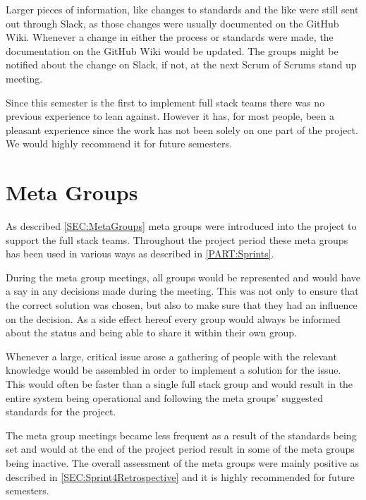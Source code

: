 Larger pieces of information, like changes to standards and the like were still sent out through Slack, as those changes were usually documented on the GitHub Wiki.
Whenever a change in either the process or standards were made, the documentation on the GitHub Wiki would be updated. 
The groups might be notified about the change on Slack, if not, at the next Scrum of Scrums stand up meeting.

Since this semester is the first to implement full stack teams there was no previous experience to lean against. 
However it has, for most people, been a pleasant experience since the work has not been solely on one part of the project.
We would highly recommend it for future semesters.

\section{Meta Groups}
As described \autoref{SEC:MetaGroups} meta groups were introduced into the project to support the full stack teams.
Throughout the project period these meta groups has been used in various ways as described in \autoref{PART:Sprints}. 

During the meta group meetings, all groups would be represented and would have a say in any decisions made during the meeting.
This was not only to ensure that the correct solution was chosen, but also to make sure that they had an influence on the decision.
As a side effect hereof every group would always be informed about the status and being able to share it within their own group.

Whenever a large, critical issue arose a gathering of people with the relevant knowledge would be assembled in order to implement a solution for the issue. 
This would often be faster than a single full stack group and would result in the entire system being operational and following the meta groups' suggested standards for the project.
  
The meta group meetings became less frequent as a result of the standards being set and would at the end of the project period result in some of the meta groups being inactive.
The overall assessment of the meta groups were mainly positive as described in \autoref{SEC:Sprint4Retrospective} and it is highly recommended for future semesters.
